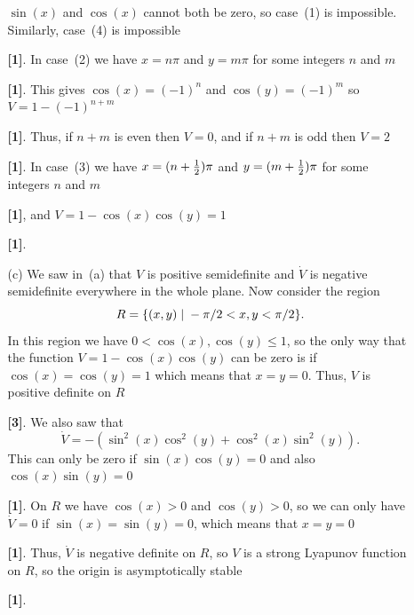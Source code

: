 \documentclass[a4paper]{article}
\newcounter{probcounter}
\newcounter{marksawarded}
\newcommand{\mks}[1]{%
\addtocounter{marksawarded}{#1}%
\textbf{\color{red}[#1]}}
\newcommand{\mk}{\mks{1}}
\newenvironment{solution}{\comment}{\endcomment}
\newenvironment{solution}{
{\bigskip\par\noindent \bf Solution:}}{
\newpage
\typeout{Q\arabic{probcounter}: \arabic{marksawarded} marks awarded}
}
\begin{document}
\begin{solution}
\begin{itemize}
\begin{itemize}
     $\sin(x)$ and $\cos(x)$ cannot both be zero, so case~(1) is
     impossible.  Similarly, case~(4) is impossible \mk. In case~(2) we
     have $x=n\pi$ and $y=m\pi$ for some integers $n$ and $m$ \mk.  This
     gives $\cos(x)=(-1)^n$ and $\cos(y)=(-1)^m$ so $V=1-(-1)^{n+m}$ \mk.
     Thus, if $n+m$ is even then $V=0$, and if $n+m$ is odd then
     $V=2$ \mk.  In case~(3) we have $x=(n+\tfrac{1}{2})\pi$ and $y=(m+\tfrac{1}{2})\pi$
     for some integers $n$ and $m$ \mk, and $V=1-\cos(x)\cos(y)=1$ \mk.
    \item[(c)] We saw in~(a) that $V$ is positive semidefinite and
     $\dot{V}$ is negative semidefinite everywhere in the whole
     plane.  Now consider the region 
     \[ R = \{(x,y)\;|\; -\pi/2 < x,y < \pi/2\}.  \]
     In this region we have $0<\cos(x),\cos(y)\leq 1$, so the only way
     that the function $V=1-\cos(x)\cos(y)$ can be zero is if
     $\cos(x)=\cos(y)=1$ which means that $x=y=0$.  Thus, $V$ is
     positive definite on $R$ \mks{3}.  We also saw that 
     \[ \dot{V} = -(\sin^2(x)\cos^2(y)+\cos^2(x)\sin^2(y)). \]
     This can only be zero if $\sin(x)\cos(y)=0$ and also
     $\cos(x)\sin(y)=0$ \mk.  On $R$ we have $\cos(x)>0$ and $\cos(y)>0$,
     so we can only have $\dot{V}=0$ if $\sin(x)=\sin(y)=0$, which
     means that $x=y=0$ \mk.  Thus, $\dot{V}$ is negative definite on $R$,
     so $V$ is a strong Lyapunov function on $R$, so the origin is
     asymptotically stable \mk.  
   \end{itemize}
 \end{itemize}
\end{solution}
\end{document}
